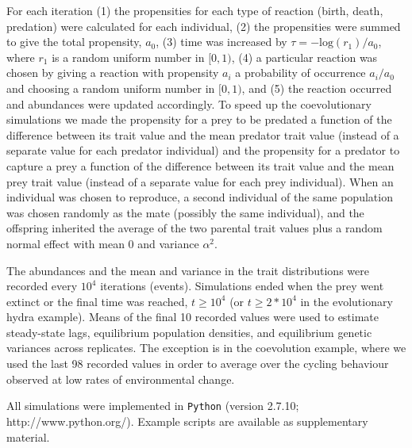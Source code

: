 \documentclass[11pt]{article}
\begin{document}
For each iteration 
(1) the propensities for each type of reaction (birth, death, predation) were calculated for each individual, 
(2) the propensities were summed to give the total propensity, $a_0$, 
(3) time was increased by $\tau = - \mathrm{log}(r_1)/a_0$, where $r_1$ is a random uniform number in $[0,1)$,
(4) a particular reaction was chosen by giving a reaction with propensity $a_i$ a probability of occurrence $a_i/a_0$ and choosing a random uniform number in $[0,1)$, and
(5) the reaction occurred and abundances were updated accordingly.
To speed up the coevolutionary simulations we made the propensity for a prey to be predated a function of the difference between its trait value and the mean predator trait value (instead of a separate value for each predator individual) and the propensity for a predator to capture a prey a function of the difference between its trait value and the mean prey trait value (instead of a separate value for each prey individual).
When an individual was chosen to reproduce, a second individual of the same population was chosen randomly as the mate (possibly the same individual), and the offspring inherited the average of the two parental trait values plus a random normal effect with mean 0 and variance $\alpha^2$.

The abundances and the mean and variance in the trait distributions were recorded every $10^4$ iterations (events).
Simulations ended when the prey went extinct or the final time was reached, $t \geq 10^4$ (or $t \geq 2*10^4$ in the evolutionary hydra example).
Means of the final 10 recorded values were used to estimate steady-state lags, equilibrium population densities, and equilibrium genetic variances across replicates.
The exception is in the coevolution example, where we used the last 98 recorded values in order to average over the cycling behaviour observed at low rates of environmental change.  


All simulations were implemented in \texttt{Python} (version 2.7.10; http://www.python.org/). Example scripts are available as supplementary material.

\newpage{}

\end{document}
